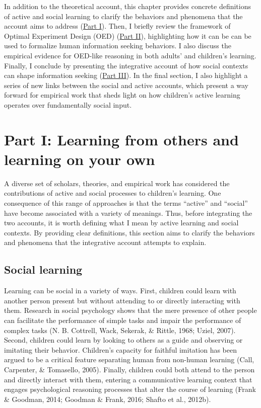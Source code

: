 \documentclass[oneside]{report}
\begin{document}
In addition to the theoretical account, this chapter provides concrete
definitions of active and social learning to clarify the behaviors and
phenomena that the account aims to address
(\protect\hyperlink{scope}{Part I}). Then, I briefly review the
framework of Optimal Experiment Design (OED)
(\protect\hyperlink{oed}{Part II}), highlighting how it can be can be
used to formalize human information seeking behaviors. I also discuss
the empirical evidence for OED-like reasoning in both adults' and
children's learning. Finally, I conclude by presenting the integrative
account of how social contexts can shape information seeking
(\protect\hyperlink{active_social}{Part III}). In the final section, I
also highlight a series of new links between the social and active
accounts, which present a way forward for empirical work that sheds
light on how children's active learning operates over fundamentally
social input.

\hypertarget{scope}{\section{Part I: Learning from others and learning
on your own}\label{scope}}

A diverse set of scholars, theories, and empirical work has considered
the contributions of active and social processes to children's learning.
One consequence of this range of approaches is that the terms ``active''
and ``social'' have become associated with a variety of meanings. Thus,
before integrating the two accounts, it is worth defining what I mean by
active learning and social contexts. By providing clear definitions,
this section aims to clarify the behaviors and phenomena that the
integrative account attempts to explain.

\subsection{Social learning}\label{social-learning}

Learning can be social in a variety of ways. First, children could learn
with another person present but without attending to or directly
interacting with them. Research in social psychology shows that the mere
presence of other people can facilitate the performance of simple tasks
and impair the performance of complex tasks (N. B. Cottrell, Wack,
Sekerak, \& Rittle, 1968; Uziel, 2007). Second, children could learn by
looking to others as a guide and observing or imitating their behavior.
Children's capacity for faithful imitation has been argued to be a
critical feature separating human from non-human learning (Call,
Carpenter, \& Tomasello, 2005). Finally, children could both attend to
the person and directly interact with them, entering a communicative
learning context that engages psychological reasoning processes that
alter the course of learning (Frank \& Goodman, 2014; Goodman \& Frank,
2016; Shafto et al., 2012b).
\end{document}
